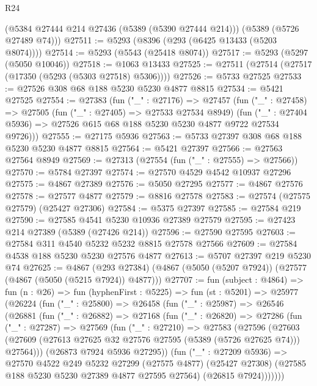 \begin{lexlean}{R24}
\begin{coremodule}
      (@5384 @27444 @214 @27436 (@5389 (@5390 @27444 @214)))
      (@5389 (@5726 @27489 @74)))
@27511 := @5293 (@8396 (@293 (@6425 @13433 (@5203 @8074))))
@27514 := @5293 (@5543 (@25418 @8074))
@27517 := @5293 (@5297 (@5050 @10046))
@27518 := @1063 @13433
@27525 := @27511 (@27514 (@27517 (@17350 (@5293 (@5303 @27518) @5306))))
@27526 := @5733 @27525
@27533 := @27526 @308 @68 @188 @5230 @5230 @4877 @8815
@27534 := @5421 @27525
@27554 := @27383
    (fun ("_" : @27176) =>
    @27457
      (fun ("_" : @27458) =>
      @27505
        (fun ("_" : @27405) => @27533 @27534 @8949)
        (fun ("_" : @27404 @5936) => @27526 @615 @68 @188 @5230 @5230 @4877 @9722 @27534 @9726)))
@27555 := @27175 @5936
@27563 := @5733 @27397 @308 @68 @188 @5230 @5230 @4877 @8815
@27564 := @5421 @27397
@27566 := @27563 @27564 @8949
@27569 := @27313 (@27554 (fun ("_" : @27555) => @27566))
@27570 := @5784 @27397
@27574 := @27570 @4529 @4542 @10937 @27296
@27575 := @4867 @27389
@27576 := @5050 @27295
@27577 := @4867 @27576
@27578 := @27577 @4877
@27579 := @8816 @27578
@27583 := @27574 (@27575 @27579) (@25427 @27306)
@27584 := @5375 @27397
@27585 := @27584 @219
@27590 := @27585 @4541 @5230 @10936 @27389 @27579
@27595 := @27423 @214 @27389 (@5389 (@27426 @214))
@27596 := @27590 @27595
@27603 := @27584 @311 @4540 @5232 @5232 @8815 @27578 @27566
@27609 := @27584 @4538 @188 @5230 @5230 @27576 @4877
@27613 := @5707 @27397 @219 @5230 @74
@27625 := @4867
    (@293 @27384)
    (@4867 (@5050 (@5207 @7924)) (@27577 (@4867 (@5050 (@5215 @7924)) @4877)))
@27707 := fun (subject : @4864) =>
  fun (n : @26) =>
  fun (hyphenFirst : @5225) =>
  fun (st : @5201) =>
  @25977
    (@26224
      (fun ("_" : @25800) =>
      @26458
        (fun ("_" : @25987) =>
        @26546
          (@26881
            (fun ("_" : @26882) =>
            @27168
              (fun ("_" : @26820) =>
              @27286
                (fun ("_" : @27287) =>
                @27569
                  (fun ("_" : @27210) =>
                  @27583
                    (@27596
                      (@27603
                        (@27609
                          (@27613 @27625 @32 @27576 @27595 (@5389 (@5726 @27625 @74)))
                          @27564)))
                    (@26873 @7924 @5936 @27295))
                  (fun ("_" : @27209 @5936) =>
                  @27570
                    @4522
                    @249
                    @5232
                    @27299
                    (@27575 @4877)
                    (@25427 @27308)
                    (@27585 @188 @5230 @5230 @27389 @4877 @27595 @27564)
                    (@26815 @7924)))))))

\end{coremodule}
\end{lexlean}
